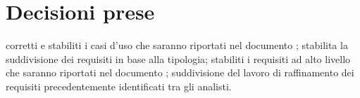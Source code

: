 \documentclass[a4paper,11pt]{article}
\begin{document}
	\section{Decisioni prese}
		\begin{itemize}
			\itemVI corretti e stabiliti i casi d'uso che saranno riportati nel documento \adrv;
			\itemVI	stabilita la suddivisione dei requisiti in base alla tipologia;
			\itemVI stabiliti i requisiti ad alto livello che saranno riportati nel documento \adrv;
			\itemVI suddivisione del lavoro di raffinamento dei requisiti precedentemente identificati tra gli analisti.
		\end{itemize}
\end{document}

